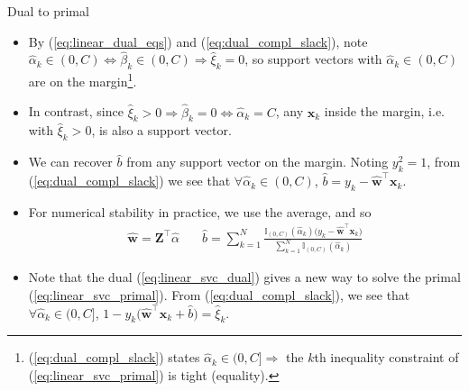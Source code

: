 \documentclass{beamer}
\numberwithin{equation}{section}
\newcommand{\aref}[1]{\alert{\ref{#1}}}
\begin{document}
\begin{frame}{Dual to primal}
    \begin{itemize}
        \item
        By (\aref{eq:linear_dual_eqs}) and (\aref{eq:dual_compl_slack}), note
        $ \hat{\alpha}_k \in (0, C) \Leftrightarrow
        \hat{\beta}_k \in (0, C) \Rightarrow \hat{\xi}_k = 0 $, so support
        vectors with $ \hat{\alpha}_k \in (0, C) $ are on the margin\footnote{
            (\aref{eq:dual_compl_slack}) states $ \hat{\alpha}_k \in (0, C]
            \Rightarrow $ the $ k $th inequality constraint of
            (\aref{eq:linear_svc_primal}) is tight (equality).
        }.

        \item
        In contrast, since $ \hat{\xi}_k > 0 \Rightarrow \hat{\beta}_k = 0
        \Leftrightarrow \hat{\alpha}_k = C $, any $ \mathbf{x}_k $ inside the
        margin, i.e. with $ \hat{\xi}_k > 0 $, is also a support vector.

        \item
        We can recover $ \hat{b} $ from any support vector on the margin.
        Noting $ y_k^2 = 1 $, from (\aref{eq:dual_compl_slack}) we see that
        $ \forall\hat{\alpha}_k \in (0, C) $,
        $ \hat{b} = y_k - \hat{\mathbf{w}}^\top\mathbf{x}_k $.

        \item
        For numerical stability \cite{esl} in practice, we use the average,
        and so
        \begin{equation} \label{eq:linear_svc_primal_from_dual}
            \begin{array}{cc}
                \displaystyle\hat{\mathbf{w}} = \mathbf{Z}^\top\hat{\alpha}
                \quad &
                \displaystyle\hat{b} =
                \sum_{k = 1}^N\frac{
                    \mathbb{I}_{(0, C)}(\hat{\alpha}_k)\big(
                        y_k - \hat{\mathbf{w}}^\top\mathbf{x}_k
                    \big)
                }{\sum_{k = 1}^N\mathbb{I}_{(0, C)}(\hat{\alpha}_k)}
            \end{array}
        \end{equation}

        \item
        Note that the dual (\aref{eq:linear_svc_dual}) gives a new way to
        solve the primal (\aref{eq:linear_svc_primal}). From
        (\aref{eq:dual_compl_slack}), we see that $ \forall \hat{\alpha}_k
        \in (0, C] $, $ 1 - y_k\big(\hat{\mathbf{w}}^\top\mathbf{x}_k +
        \hat{b}\big) = \hat{\xi}_k $.
    \end{itemize}
\end{frame}
\end{document}
